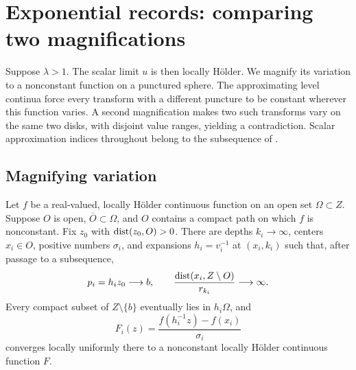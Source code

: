 \section{Exponential records: comparing two magnifications}
\label{sec:exponential}

Suppose $\lambda>1$. The scalar limit $u$ is then locally H\"older.
We magnify its variation to a nonconstant function on a punctured
sphere. The approximating level continua force every transform with a different
puncture to be constant wherever this function varies. A second
magnification makes two such transforms vary on the same two disks,
with disjoint value ranges, yielding a contradiction.
Scalar approximation indices throughout belong to the subsequence
of .

\subsection{Magnifying variation}

\begin{lemma}
\label{lem:holder-magnification}
Let $f$ be a real-valued, locally H\"older continuous function on an open set $\Omega\subset Z$.
Suppose $O$ is open, $\overline O\subset\Omega$, and $O$ contains a
compact path on which $f$ is nonconstant. Fix $z_0$ with
$\operatorname{dist}(z_0,O)>0$. There are depths $k_i\to\infty$, centers $x_i\in O$,
positive numbers $\sigma_i$, and expansions $h_i=v_i^{-1}$ at
$(x_i,k_i)$ such that, after passage to a subsequence,
\[
 p_i=h_i z_0\longrightarrow b,
 \qquad
 \frac{\operatorname{dist}(x_i,Z\setminus O)}{r_{k_i}}\longrightarrow\infty.
\]
Every compact subset of $Z\setminus\{b\}$ eventually lies in
$h_i\Omega$, and
\begin{equation}
 F_i(z)=\frac{f(h_i^{-1}z)-f(x_i)}{\sigma_i}
 \label{eq:blowup}
\end{equation}
converges locally uniformly there to a nonconstant locally H\"older
continuous function $F$.
\end{lemma}

